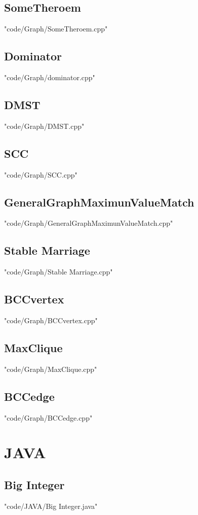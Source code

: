 \documentclass [8pt,a4paper,twocolumn]{article}
\begin{document}
\subsection{SomeTheroem}
 {"code/Graph/SomeTheroem.cpp"}
\subsection{Dominator}
 {"code/Graph/dominator.cpp"}
\subsection{DMST}
 {"code/Graph/DMST.cpp"}
\subsection{SCC}
 {"code/Graph/SCC.cpp"}
\subsection{GeneralGraphMaximunValueMatch}
 {"code/Graph/GeneralGraphMaximunValueMatch.cpp"}
\subsection{Stable Marriage}
 {"code/Graph/Stable Marriage.cpp"}
\subsection{BCCvertex}
 {"code/Graph/BCCvertex.cpp"}
\subsection{MaxClique}
 {"code/Graph/MaxClique.cpp"}
\subsection{BCCedge}
 {"code/Graph/BCCedge.cpp"}
\section{JAVA}
\subsection{Big Integer}
 {"code/JAVA/Big Integer.java"}
\end{document}
